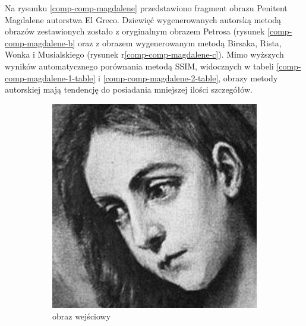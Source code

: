 	Na rysunku \ref{comp-comp-magdalene} przedstawiono fragment obrazu Penitent Magdalene autorstwa El Greco. Dziewięć wygenerowanych autorską metodą obrazów zestawionych zostało z oryginalnym obrazem Petrosa (rysunek \ref{comp-comp-magdalene-b} oraz z obrazem wygenerowanym metodą Birsaka, Rista, Wonka i Musialskiego (rysunek r\ref{comp-comp-magdalene-c}). Mimo wyższych wyników automatycznego porównania metodą SSIM, widocznych w tabeli \ref{comp-comp-magdalene-1-table} i \ref{comp-comp-magdalene-2-table}, obrazy metody autorskiej mają tendencję do posiadania mniejszej ilości szczegółów.
	\begin{figure}[H] 
    \centering
    \begin{subfigure}{0.32\textwidth}
        \centering
        \includegraphics[width = \textwidth]{img/6-comp/magdalene_original_c10_inv0.png}
        \caption{obraz wejściowy}
        \label{comp-comp-magdalene-a}
    \end{subfigure}
    \begin{subfigure}{0.32\textwidth}
        \centering

\end{subfigure}
\end{figure}
